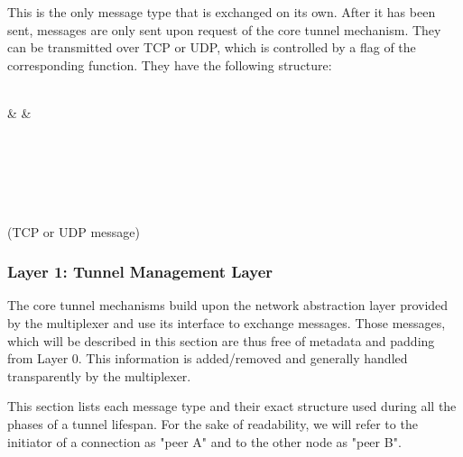 \documentclass{article}
\begin{document}
This is the only message type that is exchanged on its own. After it has been sent, messages are only sent upon request of the core tunnel mechanism. They can be transmitted over TCP or UDP, which is controlled by a flag of the corresponding function. They have the following structure:

	\begin{bytefield}[bitwidth=1.0em]{32}
		 \\
		&  
		&  \\
		 \\
		\skippedwords \\				
		 \\
		\skippedwords \\
	\end{bytefield} \\
(TCP or UDP message)

\subsubsection{Layer 1: Tunnel Management Layer}
The core tunnel mechanisms build upon the network abstraction layer provided by the multiplexer and use its interface to exchange messages. Those messages, which will be described in this section are thus free of metadata and padding from Layer 0. This information is added/removed and generally handled transparently by the multiplexer.

This section lists each message type and their exact structure used during all the phases of a tunnel lifespan. For the sake of readability, we will refer to the initiator of a connection as "peer A" and to the other node as "peer B".
\end{document}
